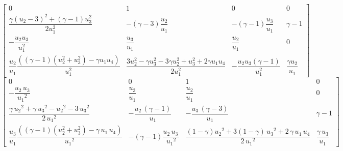 \documentclass{article}
\numberwithin{equation}{subsection}    %
\begin{document}
\begin{appendix}
    \begin{equation}
        \begin{bmatrix}
            0                                                                                                & 1                                                                                                   & 0                                         & 0                           \\
            \dfrac{\gamma (u_{2}-3)^{2}+(\gamma-1) u_{3}^{2}}{2 u_{1}^{2}}                                   & -(\gamma-3)\dfrac{u_{2}}{u_{1}}                                                                     & -(\gamma-1)\dfrac{u_{3}}{u_{1}}           & \gamma-1                    \\
            -\dfrac{u_{2} u_{3}}{u_{1}^{2}}                                                                  & \dfrac{u_{3}}{u_{1}}                                                                                & \dfrac{u_{2}}{u_{1}}                      & 0                           \\
            \dfrac{u_{2}}{u_1}\dfrac{\left((\gamma-1)(u_{2}^{2}+u_3^2)-\gamma u_{1} u_{4}\right)}{u_{1}^{2}} & \dfrac{3 u_{2}^{2}-\gamma u_{3}^{2}-3 \gamma u_{2}^{2}+u_{3}^{2}+2 \gamma u_{1} u_{4}}{2 u_{1}^{2}} & -\dfrac{u_{2} u_{3}(\gamma-1)}{u_{1}^{2}} & \dfrac{\gamma u_{2}}{u_{1}}
        \end{bmatrix}
    \end{equation}
    \begin{equation}
        \begin{bmatrix}
            0                                                                                             & 0                                                        & 1                                                                                       & 0                           \\
            -\dfrac{u_2 \,u_3 }{{u_1 }^2 }                                                                & \dfrac{u_3 }{u_1 }                                       & \dfrac{u_2 }{u_1 }                                                                      & 0                           \\
            \dfrac{\gamma \,{u_2 }^2 +\gamma \,{u_3 }^2 -{u_2 }^2 -3\,{u_3 }^2 }{2\,{u_1 }^2 }            & -\dfrac{u_2 \,{\left(\gamma -1\right)}}{u_1 }            & -\dfrac{u_3 \,{\left(\gamma -3\right)}}{u_1 }                                           & \gamma -1                   \\
            \dfrac{u_3}{u_1}\dfrac{{\left((\gamma-1)(u_2^2+u_3^2)-\gamma \,u_1 \,u_4 \right)}}{{u_1 }^2 } & -{\left(\gamma -1\right)}\dfrac{u_2 \,u_3 \,}{{u_1 }^2 } & \dfrac{(1-\gamma){u_2 }^2 +3(1-\gamma)\,{u_3 }^2 +2\,\gamma \,u_1 \,u_4 }{2\,{u_1 }^2 } & \dfrac{\gamma \,u_3 }{u_1 }
        \end{bmatrix}
    \end{equation}


\end{appendix}
\end{document}
